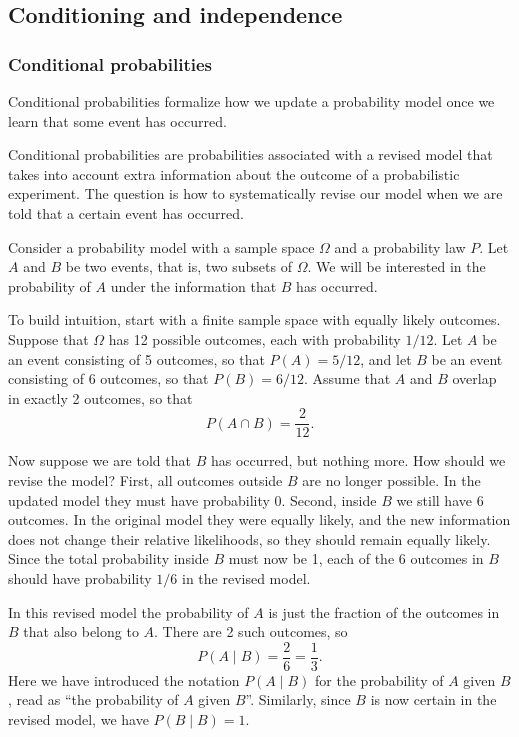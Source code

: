 
\subsection{Conditioning and independence}

\subsubsection{Conditional probabilities}
Conditional probabilities formalize how we update a probability model once we learn that some event has occurred.

Conditional probabilities are probabilities associated with a revised model that takes into account extra information about the outcome of a probabilistic experiment. The question is how to systematically revise our model when we are told that a certain event has occurred.

Consider a probability model with a sample space \(\Omega\) and a probability law \(P\). Let \(A\) and \(B\) be two events, that is, two subsets of \(\Omega\). We will be interested in the probability of \(A\) under the information that \(B\) has occurred.

To build intuition, start with a finite sample space with equally likely outcomes. Suppose that \(\Omega\) has 12 possible outcomes, each with probability \(1/12\). Let \(A\) be an event consisting of 5 outcomes, so that \(P(A) = 5/12\), and let \(B\) be an event consisting of 6 outcomes, so that \(P(B) = 6/12\). Assume that \(A\) and \(B\) overlap in exactly 2 outcomes, so that
\[
P(A \cap B) = \frac{2}{12}.
\]

Now suppose we are told that \(B\) has occurred, but nothing more. How should we revise the model? First, all outcomes outside \(B\) are no longer possible. In the updated model they must have probability \(0\). Second, inside \(B\) we still have 6 outcomes. In the original model they were equally likely, and the new information does not change their relative likelihoods, so they should remain equally likely. Since the total probability inside \(B\) must now be 1, each of the 6 outcomes in \(B\) should have probability \(1/6\) in the revised model.

In this revised model the probability of \(A\) is just the fraction of the outcomes in \(B\) that also belong to \(A\). There are 2 such outcomes, so
\[
P(A \mid B) = \frac{2}{6} = \frac{1}{3}.
\]
Here we have introduced the notation \(P(A \mid B)\) for the probability of \(A\) given \(B\), read as “the probability of \(A\) given \(B\)”. Similarly, since \(B\) is now certain in the revised model, we have \(P(B \mid B) = 1\).

